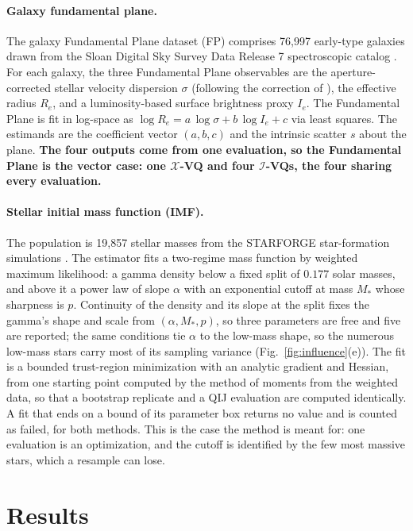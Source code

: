 \documentclass[runningheads]{llncs}
\newif\ifrev \revtrue
\newcommand{\rev}[1]{\ifrev{\color{blue}\bfseries #1}\else#1\fi}
\newcommand{\XVQ}{\ensuremath{\mathcal{X}}-VQ}
\newcommand{\IVQ}{\ensuremath{\mathcal{I}}-VQ}
\begin{document}
\paragraph{Galaxy fundamental plane.} The galaxy Fundamental Plane dataset (FP) comprises 76{,}997 early-type galaxies drawn from the Sloan Digital Sky Survey Data Release 7 spectroscopic catalog \cite{abazajian2009}. For each galaxy, the three Fundamental Plane observables are the aperture-corrected stellar velocity dispersion $\sigma$ (following the correction of \cite{jorgensen1995}), the effective radius $R_e$, and a luminosity-based surface brightness proxy $I_e$. The Fundamental Plane is fit in log-space as $\log R_e = a\,\log\sigma + b\,\log I_e + c$ via least squares. The estimands are the coefficient vector $(a,b,c)$ and the intrinsic scatter $s$ about the plane. \rev{The four outputs come from one evaluation, so the Fundamental Plane is the vector case: one \XVQ{} and four \IVQ{}s, the four sharing every evaluation.}

\rev{\paragraph{Stellar initial mass function (IMF).} The population is 19{,}857 stellar masses from the STARFORGE star-formation simulations \cite{grudic2021,guszejnov2022}. The estimator fits a two-regime mass function by weighted maximum likelihood: a gamma density below a fixed split of $0.177$ solar masses, and above it a power law of slope $\alpha$ with an exponential cutoff at mass $M_*$ whose sharpness is $p$. Continuity of the density and its slope at the split fixes the gamma's shape and scale from $(\alpha, M_*, p)$, so three parameters are free and five are reported; the same conditions tie $\alpha$ to the low-mass shape, so the numerous low-mass stars carry most of its sampling variance (Fig.~\ref{fig:influence}(e)). The fit is a bounded trust-region minimization with an analytic gradient and Hessian, from one starting point computed by the method of moments from the weighted data, so that a bootstrap replicate and a QIJ evaluation are computed identically. A fit that ends on a bound of its parameter box returns no value and is counted as failed, for both methods. This is the case the method is meant for: one evaluation is an optimization, and the cutoff is identified by the few most massive stars, which a resample can lose.}

\section{Results}\label{sec:results}
\end{document}

